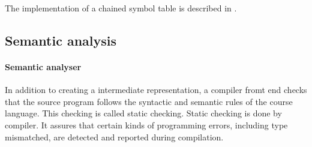 The implementation of a chained symbol table is described in \cite{dragonbook}.


%
%


\subsection{Semantic analysis}
  \paragraph{Semantic analyser}
In addition to creating a intermediate representation, a compiler fromt end checks that the source program follows the syntactic and semantic rules of the course language. This checking is called static checking. Static checking is done by compiler. It assures that certain kinds of programming errors, including type mismatched, are detected and reported during compilation.

